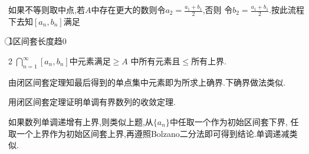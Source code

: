 \documentclass[windows,list,answers]{BHCexam}
\begin{document}
\begin{questions}
\begin{solution}{1cm}
        如果不等则取中点,若$A$中存在更大的数则令$a_2=\frac{a_1+b_1}{2}$,否则
        令$b_2=\frac{a_1+b_1}{2}$.按此流程下去知$[a_n,b_n]$满足
        
        \textcircled{1}区间套长度趋0
        
        \textcircled{2}$\textstyle\bigcap_{n=1}^\infty[a_n,b_n]$中元素满足$\geqslant A$
        中所有元素且$\leqslant $所有上界.
        
        由闭区间套定理知最后得到的单点集中元素即为所求上确界.下确界做法类似.
    \end{solution}
    
    \question
    用闭区间套定理证明单调有界数列的收敛定理.
    \begin{solution}{1cm}
        \methodonly
        如果数列单调递增有上界,则类似上题,从$\{a_n\}$中任取一个作为初始区间套下界,
        任取一个上界作为初始区间套上界,再遵照Bolzano二分法即可得到结论.单调递减类似.
    \end{solution}

\end{questions}
\end{document}
